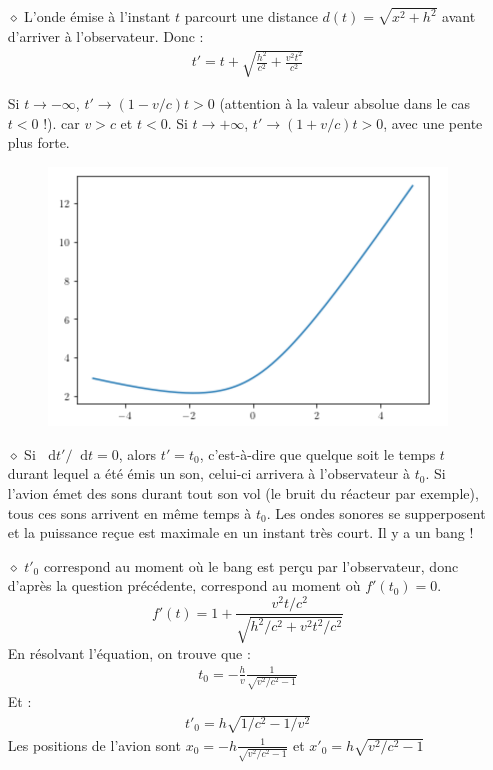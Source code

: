 \documentclass{report}
\newcommand*\dif{\mathop{}\!\mathrm{d}}
\begin{document}
\begin{itemize}
	\item[$\diamond$] L'onde émise à l'instant $t$ parcourt une distance $d(t)=\sqrt{x^2+h^2}$ avant d'arriver à l'observateur. Donc :
	\begin{align*}
		t'=t+\sqrt{\frac{h^2}{c^2}+\frac{v^2t^2}{c^2}}
	\end{align*}

Si $t\longrightarrow-\infty$, $t'\longrightarrow (1-v/c)t>0$ (attention à la valeur absolue dans le cas $t<0$ !). car $v>c$ et $t<0$. Si $t\longrightarrow+\infty$, $t'\longrightarrow (1+v/c)t>0$, avec une pente plus forte.

\begin{figure}[h!]
\centering
		\includegraphics[scale=0.5]{onde_choc.png}
\end{figure}	
	
	\item[$\diamond$] Si $\dif t'/\dif t=0$, alors $t'=t_0$, c'est-à-dire que quelque soit le temps $t$ durant lequel a été émis un son, celui-ci arrivera à l'observateur à $t_0$. Si l'avion émet des sons durant tout son vol (le bruit du réacteur par exemple), tous ces sons arrivent en même temps à $t_0$. Les ondes sonores se supperposent et la puissance reçue est maximale en un instant très court. Il y a un bang !
	
	\item[$\diamond$] $t'_0$ correspond au moment où le bang est perçu par l'observateur, donc d'après la question précédente, correspond au moment où $f'(t_0)=0$.
	\begin{equation}
		f'(t)=1+\frac{v^2t/c^2}{\sqrt{h^2/c^2+v^2t^2/c^2}}
	\end{equation}
	En résolvant l'équation, on trouve que :
	\begin{align*}
		t_0=-\frac{h}{v}\frac{1}{\sqrt{v^2/c^2-1}}
	\end{align*}
	Et :
	\begin{align*}
		t'_0=h\sqrt{1/c^2-1/v^2}
	\end{align*}
	Les positions de l'avion sont $x_0=-h\frac{1}{\sqrt{v^2/c^2-1}}$ et $x'_0=h\sqrt{v^2/c^2-1}$
	

\end{itemize}
\end{document}
